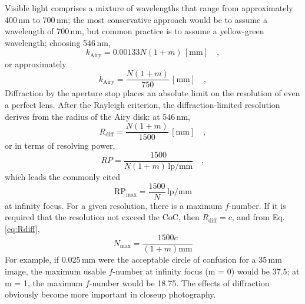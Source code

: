 \documentclass[11pt, oneside]{scrartcl}   	%
\begin{document}
Visible light comprises a mixture of wavelengths that range from
approximately 400\,nm to 700\,nm; the most conservative approach would
be to assume a wavelength of 700\,nm, but common practice is to assume
a yellow-green wavelength; choosing 546\,nm,
\begin{equation}
  \label{eq:airy2}
  k_\mathrm{Airy}  = 0.00133N(1+m)\,[\mathrm{mm}]\quad,
\end{equation}
or approximately
\begin{equation}
  \label{eq:airy3}
   k_\mathrm{Airy}  =\frac{N(1+m)}{750}\,[\mathrm{mm}]\quad,
\end{equation}
Diffraction by the aperture stop places an absolute limit on the resolution of even a perfect lens. After the Rayleigh criterion, the diffraction-limited resolution derives from the radius of the Airy disk: at 546\,nm,
\begin{equation}
  \label{eq:Rdiff}
  R_\mathrm{diff} = \frac{N (1+ m)}{1500}\,[\mathrm{mm}]\quad ,
\end{equation}
or in terms of resolving power,
\begin{equation}
  \label{eq:RP}
  RP = \frac{1500}{N(1+m)\,\mathrm{lp/mm}}\quad,
\end{equation}
which leads the commonly cited
\begin{equation}
  \label{eq:RPmax}
  \mathrm{RP_{max}}  = \frac{1500}N\,\mathrm{lp/mm}
\end{equation}
at infinity focus. For a given resolution, there is a maximum $f$-number. If it is required that the resolution not exceed the CoC, then $R_\mathrm{diff} = c$, and from Eq. \ref{eq:Rdiff},
\begin{equation}
   \label{eq:Nmax}
   N_\mathrm{max}=\frac{1500c}{(1+m) \mathrm{mm}}
\end{equation}
For example, if 0.025\,mm were the acceptable circle of confusion for a 35\,mm image, the maximum usable $f$-number at infinity focus (m = 0) would be 37.5; at m = 1, the maximum $f$-number would be 18.75. The effects of diffraction obviously become more important in closeup photography.
\end{document}
